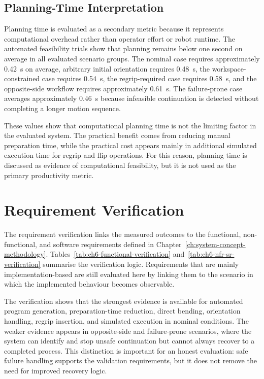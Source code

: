\subsection{Planning-Time Interpretation}
\label{subsec:planning-time-interpretation}

Planning time is evaluated as a secondary metric because it represents computational overhead rather than operator effort or robot runtime. The automated feasibility trials show that planning remains below one second on average in all evaluated scenario groups. The nominal case requires approximately \SI{0.42}{\second} on average, arbitrary initial orientation requires \SI{0.48}{\second}, the workspace-constrained case requires \SI{0.54}{\second}, the regrip-required case requires \SI{0.58}{\second}, and the opposite-side workflow requires approximately \SI{0.61}{\second}. The failure-prone case averages approximately \SI{0.46}{\second} because infeasible continuation is detected without completing a longer motion sequence.

These values show that computational planning time is not the limiting factor in the evaluated system. The practical benefit comes from reducing manual preparation time, while the practical cost appears mainly in additional simulated execution time for regrip and flip operations. For this reason, planning time is discussed as evidence of computational feasibility, but it is not used as the primary productivity metric.

\section{Requirement Verification}
\label{sec:requirement-verification}

The requirement verification links the measured outcomes to the functional, non-functional, and software requirements defined in Chapter~\ref{ch:system-concept-methodology}. Tables~\ref{tab:ch6-functional-verification} and~\ref{tab:ch6-nfr-sr-verification} summarise the verification logic. Requirements that are mainly implementation-based are still evaluated here by linking them to the scenario in which the implemented behaviour becomes observable.




The verification shows that the strongest evidence is available for automated program generation, preparation-time reduction, direct bending, orientation handling, regrip insertion, and simulated execution in nominal conditions. The weaker evidence appears in opposite-side and failure-prone scenarios, where the system can identify and stop unsafe continuation but cannot always recover to a completed process. This distinction is important for an honest evaluation: safe failure handling supports the validation requirements, but it does not remove the need for improved recovery logic.

